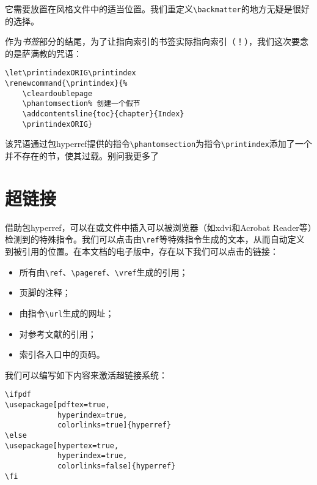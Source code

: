 它需要放置在风格文件中的适当位置。我们重定义\verb|\backmatter|的地方无疑是很好的选择。

\begin{qquestion}
作为\emph{书签}部分的结尾，为了让指向索引的书签实际指向索引（！），我们这次要念的是萨满教的咒语：

\begin{dmd}
\begin{verbatim}
\let\printindexORIG\printindex 
\renewcommand{\printindex}{%
    \cleardoublepage
    \phantomsection% 创建一个假节
    \addcontentsline{toc}{chapter}{Index} 
    \printindexORIG}
\end{verbatim}
\end{dmd}

该咒语通过包hyperref提供的指令\verb|\phantomsection|为指令\verb|\printindex|添加了一个并不存在的节，使其过载。别问我更多了\dm{:-)}
\end{qquestion}

\section{超链接}

借助包\textsf{hyperref}，可以在或文件中插入可以被浏览器（如\textsf{xdvi}和\textsf{Acrobat Reader}等）检测到的特殊指令。我们可以点击由\verb|\ref|等特殊指令生成的文本，从而自动定义到被引用的位置。在本文档的电子版中，存在以下我们可以点击的链接：

\begin{itemize}
    \item 所有由\verb|\ref|、\verb|\pageref|、\verb|\vref|生成的引用；
    \item 页脚的注释；
    \item 由指令\verb|\url|生成的网址；
    \item 对参考文献的引用；
    \item 索引各入口中的页码。
\end{itemize}

我们可以编写如下内容来激活超链接系统：

\begin{dmd}
\begin{verbatim}
\ifpdf
\usepackage[pdftex=true,
            hyperindex=true,
            colorlinks=true]{hyperref}
\else
\usepackage[hypertex=true,
            hyperindex=true,
            colorlinks=false]{hyperref}
\fi
\end{verbatim}
\end{dmd}

